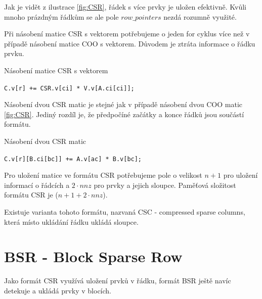 Jak je vidět z ilustrace \ref{fig:CSR}, řádek s více prvky je uložen efektivně. Kvůli mnoho prázdným řádkům se ale pole $row\_pointers$ nezdá rozumně využité.

Při násobení matice CSR s vektorem potřebujeme o jeden for cyklus více než v případě násobení matice COO s vektorem. Důvodem je ztráta informace o řádku prvku.

\begin{algorithm}[htb]
	\caption{Násobení matice CSR s vektorem}\label{csr-mvm}
	\begin{algorithmic}[1]
				\State \texttt{C.v[r] += CSR.v[ci] * V.v[A.ci[ci]];}
			\EndFor
		\EndFor
		\EndProcedure
	\end{algorithmic}
\end{algorithm}

Násobení dvou CSR matic je stejné jak v případě násobení dvou COO matic \ref{fig:CSR}. Jediný rozdíl je, že předpočíné začátky a konce řádků jsou součástí formátu.

\label{alg:csr-mmm}
\begin{algorithm}[htb]
	\caption{Násobení dvou CSR matic}\label{csr-mmm}
	\begin{algorithmic}[1]
					\State \texttt{C.v[r][B.ci[bc]] += A.v[ac] * B.v[bc];}
				\EndFor
			\EndFor
		\EndFor
		\EndProcedure
	\end{algorithmic}
\end{algorithm}

Pro uložení matice ve formátu CSR potřebujeme pole o velikost $n + 1$ pro uložení informací o řádcích a $2 \cdot nnz$ pro prvky a jejich sloupce. Paměťová složitost formátu CSR je \bigO($ n+1 + 2 \cdot nnz $). 

Existuje varianta tohoto formátu, nazvaná CSC - compressed sparse columns, která místo ukládání řádku ukládá sloupce.

\section{BSR - Block Sparse Row}

Jako formát CSR využívá uložení prvků v řádku, formát BSR\cite{bsrscipy}\cite{bsrintel} ještě navíc detekuje a ukládá prvky v blocích.

